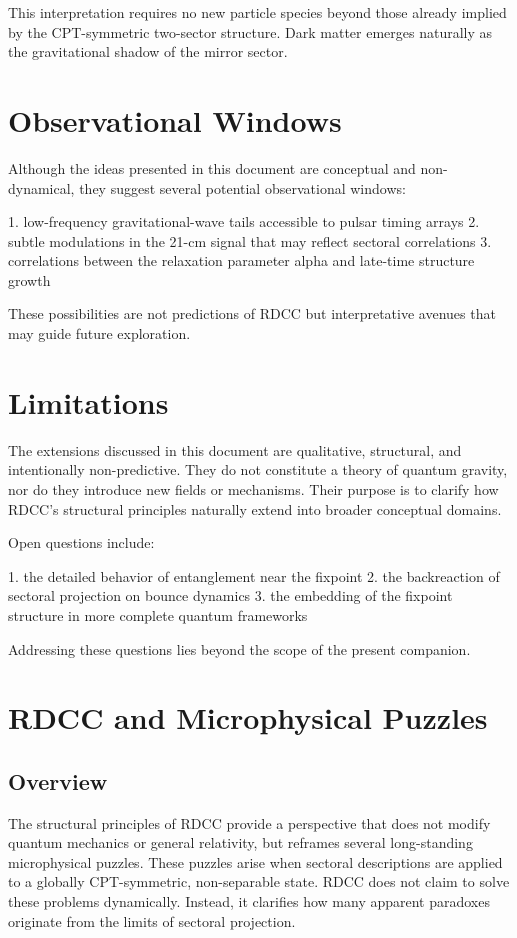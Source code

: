 \documentclass[11pt,a4paper]{article}
\begin{document}
This interpretation requires no new particle species beyond those already implied by the CPT-symmetric two-sector structure. Dark matter emerges naturally as the gravitational shadow of the mirror sector.

\section{Observational Windows}

Although the ideas presented in this document are conceptual and non-dynamical, they suggest several potential observational windows:

1. low-frequency gravitational-wave tails accessible to pulsar timing arrays  
2. subtle modulations in the 21-cm signal that may reflect sectoral correlations  
3. correlations between the relaxation parameter alpha and late-time structure growth  

These possibilities are not predictions of RDCC but interpretative avenues that may guide future exploration.

\section{Limitations}

The extensions discussed in this document are qualitative, structural, and intentionally non-predictive. They do not constitute a theory of quantum gravity, nor do they introduce new fields or mechanisms. Their purpose is to clarify how RDCC's structural principles naturally extend into broader conceptual domains.

Open questions include:

1. the detailed behavior of entanglement near the fixpoint  
2. the backreaction of sectoral projection on bounce dynamics  
3. the embedding of the fixpoint structure in more complete quantum frameworks  

Addressing these questions lies beyond the scope of the present companion.

\section{RDCC and Microphysical Puzzles}

\subsection{Overview}

The structural principles of RDCC provide a perspective that does not modify quantum mechanics or general relativity, but reframes several long-standing microphysical puzzles. These puzzles arise when sectoral descriptions are applied to a globally CPT-symmetric, non-separable state. RDCC does not claim to solve these problems dynamically. Instead, it clarifies how many apparent paradoxes originate from the limits of sectoral projection.
\end{document}
